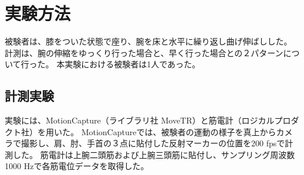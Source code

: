 \documentclass{jsarticle}
\begin{document}
\section{実験方法}
被験者は、膝をついた状態で座り、腕を床と水平に繰り返し曲げ伸ばしした。
計測は、腕の伸縮をゆっくり行った場合と、早く行った場合との２パターンについて行った。
本実験における被験者は1人であった。
                                                                                                                                                                                                                                                                                                                                                                                                                                                                                                                                                                                                                                                                                                                                                                                                                                                                                                                                                                                                                                                                                                                                                                                                                                                                                                                                                                                                                                                                                                                                                                                                                                                                                                                                                                                                                                                                                                                                                                                                                                                                                                                                                   
\subsection{計測実験}
実験には、MotionCapture（ライブラリ社 MoveTR）と筋電計（ロジカルプロダクト社）を用いた。
MotionCaptureでは、被験者の運動の様子を真上からカメラで撮影し、肩、肘、手首の３点に貼付した反射マーカーの位置を200 fpsで計測した。
筋電計は上腕二頭筋および上腕三頭筋に貼付し、サンプリング周波数1000 Hzで各筋電位データを取得した。
\end{document}
